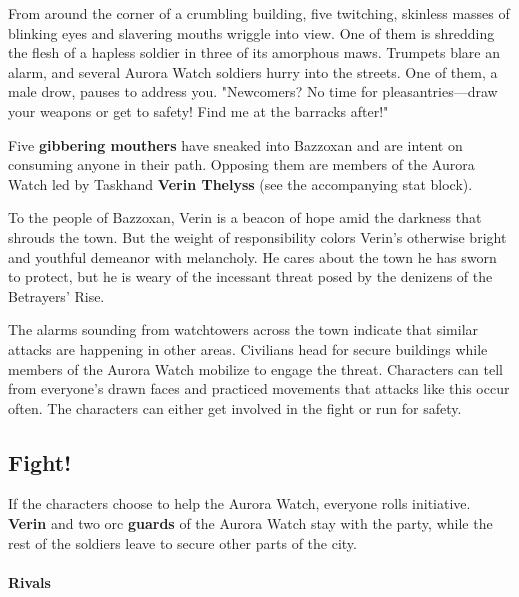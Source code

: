 \documentclass[letterpaper, 11pt, bg=full, twocolumn]{dndbook}
\begin{document}
\begin{DndReadAloud}
From around the corner of a crumbling building, five twitching, skinless masses of blinking eyes and slavering mouths wriggle into view. One of them is shredding the flesh of a hapless soldier in three of its amorphous maws. Trumpets blare an alarm, and several Aurora Watch soldiers hurry into the streets. One of them, a male drow, pauses to address you. "Newcomers? No time for pleasantries---draw your weapons or get to safety! Find me at the barracks after!"
\end{DndReadAloud}


Five \textbf{gibbering mouthers} have sneaked into Bazzoxan and are intent on consuming anyone in their path. Opposing them are members of the Aurora Watch led by Taskhand \textbf{Verin Thelyss} (see the accompanying stat block).

To the people of Bazzoxan, Verin is a beacon of hope amid the darkness that shrouds the town. But the weight of responsibility colors Verin's otherwise bright and youthful demeanor with melancholy. He cares about the town he has sworn to protect, but he is weary of the incessant threat posed by the denizens of the Betrayers' Rise.

The alarms sounding from watchtowers across the town indicate that similar attacks are happening in other areas. Civilians head for secure buildings while members of the Aurora Watch mobilize to engage the threat. Characters can tell from everyone's drawn faces and practiced movements that attacks like this occur often. The characters can either get involved in the fight or run for safety.


\subsection{Fight!}

If the characters choose to help the Aurora Watch, everyone rolls initiative. \textbf{Verin} and two orc \textbf{guards} of the Aurora Watch stay with the party, while the rest of the soldiers leave to secure other parts of the city.

\paragraph{Rivals}
\end{document}
